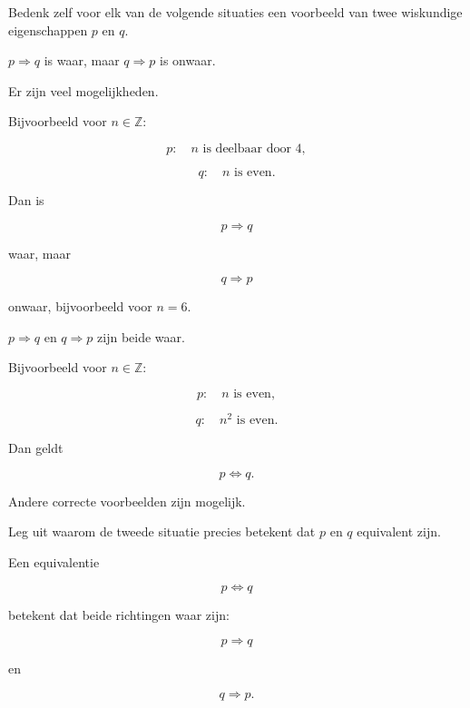 \documentclass{ximera}
\begin{document}
\begin{oefening}{\oefG}

Bedenk zelf voor elk van de volgende situaties een voorbeeld van twee
wiskundige eigenschappen $p$ en $q$.

\begin{question}

$p\Rightarrow q$ is waar, maar $q\Rightarrow p$ is onwaar.

\begin{oplossing}

Er zijn veel mogelijkheden.

Bijvoorbeeld voor $n\in\mathbb{Z}$:

\[
p:\quad n\text{ is deelbaar door }4,
\]

\[
q:\quad n\text{ is even}.
\]

Dan is

\[
p\Rightarrow q
\]

waar, maar

\[
q\Rightarrow p
\]

onwaar, bijvoorbeeld voor $n=6$.

\end{oplossing}

\end{question}


\begin{question}

$p\Rightarrow q$ en $q\Rightarrow p$ zijn beide waar.

\begin{oplossing}

Bijvoorbeeld voor $n\in\mathbb{Z}$:

\[
p:\quad n\text{ is even},
\]

\[
q:\quad n^2\text{ is even}.
\]

Dan geldt

\[
p\Leftrightarrow q.
\]

Andere correcte voorbeelden zijn mogelijk.

\end{oplossing}

\end{question}


\begin{question}

Leg uit waarom de tweede situatie precies betekent dat $p$ en $q$
equivalent zijn.

\begin{oplossing}

Een equivalentie

\[
p\Leftrightarrow q
\]

betekent dat beide richtingen waar zijn:

\[
p\Rightarrow q
\]

en

\[
q\Rightarrow p.
\]

\end{oplossing}

\end{question}

\end{oefening}
\end{document}
